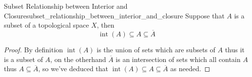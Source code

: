 \begin{proposition}{Subset Relationship between Interior and
Closure}{subset_relationship_between_interior_and_closure}
Suppose that \( A \) is a subset of a topological space \( X \), then 
\[
\operatorname{ int } \left( A \right)  \subseteq A \subseteq \overline{A} 
\]
\end{proposition}
\begin{proof}
    By definition \( \operatorname{ int } \left( A \right)  \) is the union of
    sets which are subsets of \( A \) thus it is a subset of \( A \), on the
    otherhand \( \overline{A}  \) is an intersection of sets which all contain
    \( A \) thus \( A \subseteq \overline{A}  \), so we've deduced that \(
    \operatorname{ int } \left( A \right) \subseteq A \subseteq \overline{A}
    \) as needed.
\end{proof}
